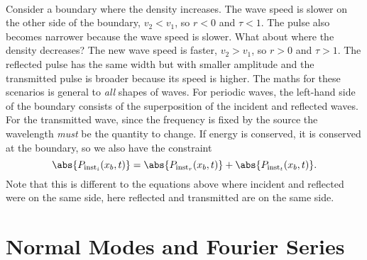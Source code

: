 \documentclass[../classical_mechanics.tex]{subfiles}
\begin{document}
        \paragraph{}
        Consider a boundary where the density increases.
        The wave speed is slower on the other side of the boundary, $v_2<v_1$, so $r<0$ and $\tau<1$.
        The pulse also becomes narrower because the wave speed is slower.
        What about where the density decreases?
        The new wave speed is faster, $v_2>v_1$, so $r>0$ and $\tau>1$.
        The reflected pulse has the same width but with smaller amplitude and the transmitted pulse is broader because its speed is higher.
        The maths for these scenarios is general to \textit{all} shapes of waves.
        For periodic waves, the left-hand side of the boundary consists of the superposition of the incident and reflected waves.
        For the transmitted wave, since the frequency is fixed by the source the wavelength \textit{must} be the quantity to change.
        If energy is conserved, it is conserved at the boundary, so we also have the constraint
        \begin{equation}
            \abs{P_{\text{inst}_i}(x_b,t)}=\abs{P_{\text{inst}_r}(x_b,t)}+\abs{P_{\text{inst}_t}(x_b,t)}.
        \end{equation}
        Note that this is different to the equations above where incident and reflected were on the same side, here reflected and transmitted are on the same side.

    \section{Normal Modes and Fourier Series}
\end{document}
